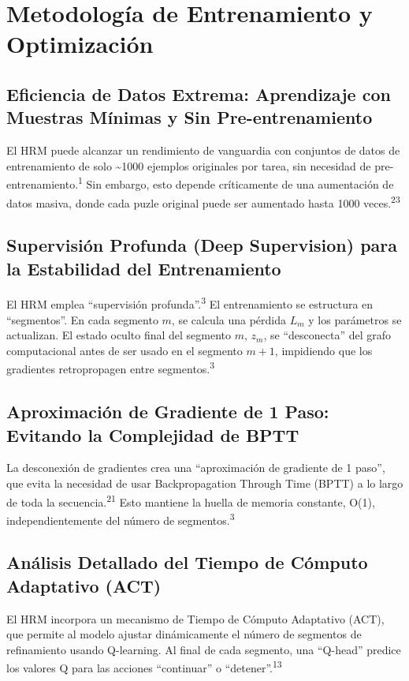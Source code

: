 \documentclass{article}
\begin{document}
	\section{Metodología de Entrenamiento y Optimización}
	
	\subsection{Eficiencia de Datos Extrema: Aprendizaje con Muestras Mínimas y Sin Pre-entrenamiento}
	El HRM puede alcanzar un rendimiento de vanguardia con conjuntos de datos de entrenamiento de solo \textasciitilde1000 ejemplos originales por tarea, sin necesidad de pre-entrenamiento.\textsuperscript{1} Sin embargo, esto depende críticamente de una aumentación de datos masiva, donde cada puzle original puede ser aumentado hasta 1000 veces.\textsuperscript{23}
	
	\subsection{Supervisión Profunda (Deep Supervision) para la Estabilidad del Entrenamiento}
	El HRM emplea ``supervisión profunda''.\textsuperscript{3} El entrenamiento se estructura en ``segmentos''. En cada segmento \(m\), se calcula una pérdida \(L_m\) y los parámetros se actualizan. El estado oculto final del segmento \(m\), \(z_m\), se ``desconecta'' del grafo computacional antes de ser usado en el segmento \(m+1\), impidiendo que los gradientes retropropagen entre segmentos.\textsuperscript{3}
	
	\subsection{Aproximación de Gradiente de 1 Paso: Evitando la Complejidad de BPTT}
	La desconexión de gradientes crea una ``aproximación de gradiente de 1 paso'', que evita la necesidad de usar Backpropagation Through Time (BPTT) a lo largo de toda la secuencia.\textsuperscript{21} Esto mantiene la huella de memoria constante, O(1), independientemente del número de segmentos.\textsuperscript{3}
	
	\subsection{Análisis Detallado del Tiempo de Cómputo Adaptativo (ACT)}
	El HRM incorpora un mecanismo de Tiempo de Cómputo Adaptativo (ACT), que permite al modelo ajustar dinámicamente el número de segmentos de refinamiento usando Q-learning. Al final de cada segmento, una ``Q-head'' predice los valores Q para las acciones ``continuar'' o ``detener''.\textsuperscript{13}
	
\end{document}
